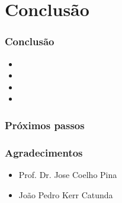 \documentclass{beamer}
\begin{document}
\section{Conclusão}

\begin{frame}
  \frametitle{Conclusão}
  \begin{itemize}
    \item
    \item
    \item
    \item
  \end{itemize}
\end{frame}

\begin{frame}
  \frametitle{Próximos passos}
  \begin{itemize}
  \end{itemize}
\end{frame}

\begin{frame}
  \frametitle{Agradecimentos}
  \begin{itemize}
    \item Prof. Dr. Jose Coelho Pina
    \item João Pedro Kerr Catunda
  \end{itemize}
\end{frame}
\end{document}
